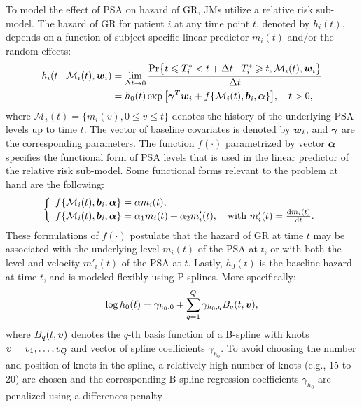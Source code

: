 To model the effect of PSA on hazard of GR, JMs utilize a relative risk sub-model. The hazard of GR for patient $i$ at any time point $t$, denoted by $h_i(t)$, depends on a function of subject specific linear predictor $m_i(t)$ and/or the random effects:
\begin{align*}
h_i(t \mid \mathcal{M}_i(t), \boldsymbol{w}_i) &= \lim_{\Delta t \to 0} \frac{\mbox{Pr}\big\{t \leqslant T^*_i < t + \Delta t \mid T^*_i \geqslant t, \mathcal{M}_i(t), \boldsymbol{w}_i\big\}}{\Delta t}\\
&=h_0(t) \exp\big[\boldsymbol{\gamma}^T\boldsymbol{w}_i + f\{\mathcal{M}_i(t), \boldsymbol{b}_i, \boldsymbol{\alpha}\}\big], \quad t>0,
\end{align*}
where $\mathcal{M}_i(t) = \{m_i(v), 0\leq v \leq t\}$ denotes the history of the underlying PSA levels up to time $t$. The vector of baseline covariates is denoted by $\boldsymbol{w}_i$, and $\boldsymbol{\gamma}$ are the corresponding parameters. The function $f(\cdot)$ parametrized by vector $\boldsymbol{\alpha}$ specifies the functional form of PSA levels \citep{brown2009assessing,rizopoulos2012joint,taylor2013real,rizopoulos2014bma} that is used in the linear predictor of the relative risk sub-model. Some functional forms relevant to the problem at hand are the following: 
\begin{eqnarray*}
\left \{
\begin{array}{l}
f\{\mathcal{M}_i(t), \boldsymbol{b}_i, \boldsymbol{\alpha}\} = \alpha m_i(t),\\
f\{\mathcal{M}_i(t), \boldsymbol{b}_i, \boldsymbol{\alpha}\} = \alpha_1 m_i(t) + \alpha_2 m'_i(t),\quad \text{with}\  m'_i(t) = \frac{\mathrm{d}{m_i(t)}}{\mathrm{d}{t}}.\\
\end{array}
\right.
\end{eqnarray*}
These formulations of $f(\cdot)$ postulate that the hazard of GR at time $t$ may be associated with the underlying level $m_i(t)$ of the PSA at $t$, or with both the level and velocity $m'_i(t)$ of the PSA at $t$. Lastly, $h_0(t)$ is the baseline hazard at time $t$, and is modeled flexibly using P-splines. More specifically:
\begin{equation*}
\log{h_0(t)} = \gamma_{h_0,0} + \sum_{q=1}^Q \gamma_{h_0,q} B_q(t, \boldsymbol{v}),
\end{equation*}
where $B_q(t, \boldsymbol{v})$ denotes the $q$-th basis function of a B-spline with knots $\boldsymbol{v} = v_1, \ldots, v_Q$ and vector of spline coefficients $\gamma_{h_0}$. To avoid choosing the number and position of knots in the spline, a relatively high number of knots (e.g., 15 to 20) are chosen and the corresponding B-spline regression coefficients $\gamma_{h_0}$ are penalized using a differences penalty \citep{eilers1996flexible}.


